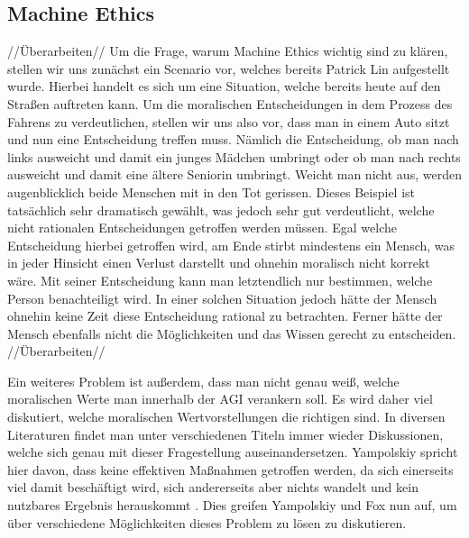     \subsection{Machine Ethics}
    //Überarbeiten//    
    Um die Frage, warum Machine Ethics wichtig sind zu klären, stellen wir uns zunächst ein
    Scenario vor, welches bereits Patrick Lin \cite[p. 70]{maurer_gerdes_lenz_winner_2015}
    aufgestellt wurde. Hierbei handelt es sich um eine Situation, welche bereits heute auf den 
    Straßen auftreten kann. Um die moralischen Entscheidungen in dem Prozess des Fahrens zu 
    verdeutlichen, stellen wir uns also vor, dass man in einem Auto sitzt und nun eine 
    Entscheidung treffen muss. Nämlich die Entscheidung, ob man nach links ausweicht und damit
    ein junges Mädchen umbringt oder ob man nach rechts ausweicht und damit eine ältere 
    Seniorin umbringt. Weicht man nicht aus, werden augenblicklich beide Menschen mit in den 
    Tot gerissen. Dieses Beispiel ist tatsächlich sehr dramatisch gewählt, was jedoch sehr gut
    verdeutlicht, welche nicht rationalen Entscheidungen getroffen werden müssen. Egal welche 
    Entscheidung hierbei getroffen wird, am Ende stirbt mindestens ein Mensch, was in jeder 
    Hinsicht einen Verlust darstellt und ohnehin moralisch nicht korrekt wäre. \cite[p. 70]{maurer_gerdes_lenz_winner_2015}
    Mit seiner Entscheidung kann man letztendlich nur bestimmen, welche Person benachteiligt 
    wird. In einer solchen Situation jedoch hätte der Mensch ohnehin keine Zeit diese Entscheidung
    rational zu betrachten. Ferner hätte der Mensch ebenfalls nicht die Möglichkeiten und 
    das Wissen gerecht zu entscheiden.
    //Überarbeiten// 
    
    Ein weiteres Problem ist außerdem, dass man nicht genau weiß, welche moralischen Werte man
    innerhalb der AGI verankern soll. \cite[p. 1]{yampolskiy2013safety} Es wird daher viel 
    diskutiert, welche moralischen Wertvorstellungen die richtigen sind. In diversen Literaturen
    findet man unter verschiedenen Titeln immer wieder Diskussionen, welche sich genau mit dieser
    Fragestellung auseinandersetzen. Yampolskiy spricht hier davon, dass keine effektiven 
    Maßnahmen getroffen werden, da sich einerseits viel damit beschäftigt wird, sich andererseits 
    aber nichts wandelt und kein nutzbares Ergebnis herauskommt \cite[p. 1]{yampolskiy2013safety}.
    Dies greifen Yampolskiy und Fox nun auf, um über verschiedene Möglichkeiten dieses Problem zu
    lösen zu diskutieren. 
    
